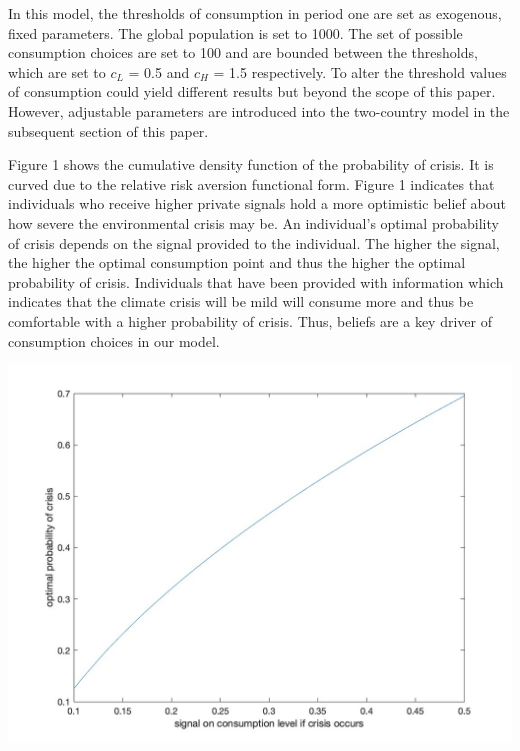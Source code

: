 \documentclass[11pt,preprint, authoryear]{elsarticle}
\let\origfigure\figure
\let\endorigfigure\endfigure
\renewenvironment{figure}[1][2] {
    \expandafter\origfigure\expandafter[H]
} {
    \endorigfigure
}
\numberwithin{equation}{section}
\numberwithin{figure}{section}
\numberwithin{table}{section}
\begin{document}
In this model, the thresholds of consumption in period one are set as
exogenous, fixed parameters. The global population is set to 1000. The
set of possible consumption choices are set to 100 and are bounded
between the thresholds, which are set to \(c_L\) = 0.5 and \(c_H\) = 1.5
respectively. To alter the threshold values of consumption could yield
different results but beyond the scope of this paper. However,
adjustable parameters are introduced into the two-country model in the
subsequent section of this paper.

Figure 1 shows the cumulative density function of the probability of
crisis. It is curved due to the relative risk aversion functional form.
Figure 1 indicates that individuals who receive higher private signals
hold a more optimistic belief about how severe the environmental crisis
may be. An individual's optimal probability of crisis depends on the
signal provided to the individual. The higher the signal, the higher the
optimal consumption point and thus the higher the optimal probability of
crisis. Individuals that have been provided with information which
indicates that the climate crisis will be mild will consume more and
thus be comfortable with a higher probability of crisis. Thus, beliefs
are a key driver of consumption choices in our model.

\begin{figure}[H]

{\centering \includegraphics[width=0.8\linewidth]{images/Figure1base} 

}

\caption{Optimal probability of crisis as mapped from different beliefs about the optimal consumption level}\label{fig:unnamed-chunk-1}
\end{figure}
\end{document}
